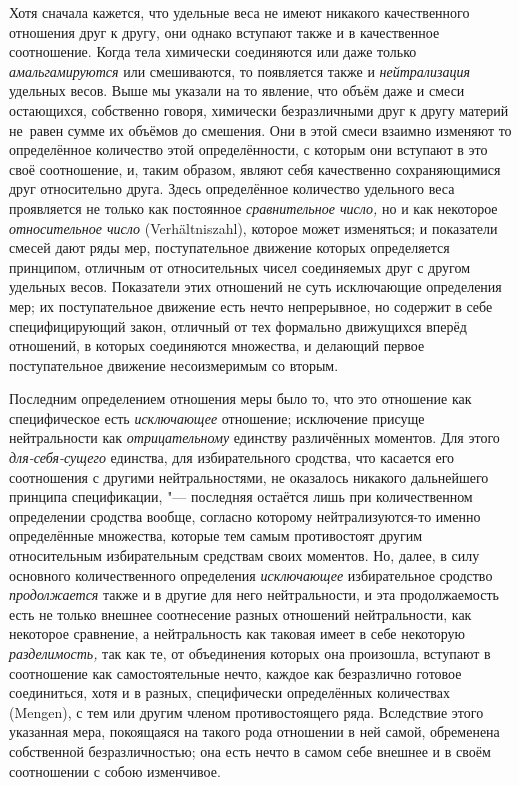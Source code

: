Хотя сначала кажется, что удельные веса не имеют никакого качественного
отношения друг к другу, они однако вступают также и в качественное соотношение.
Когда тела химически соединяются или даже только {\em амальгамируются} или
смешиваются, то появляется также и {\em нейтрализация} удельных весов. Выше
мы указали на то явление, что объём даже и смеси остающихся, собственно говоря,
химически безразличными друг к другу материй не~равен сумме их объёмов до
смешения. Они в этой смеси взаимно изменяют то определённое количество этой
определённости, с которым они вступают в это своё соотношение, и, таким
образом, являют себя качественно сохраняющимися друг относительно друга. Здесь
определённое количество удельного веса проявляется не только как постоянное
{\em сравнительное число,} но и как некоторое {\em относительное число}
(Ver\-hält\-nis\-zahl), которое может изменяться; и показатели смесей дают ряды
мер, поступательное движение которых определяется принципом, отличным от
относительных чисел соединяемых друг с другом удельных весов. Показатели
этих отношений не суть исключающие определения мер; их поступательное движение
есть нечто непрерывное, но содержит в себе специфицирующий закон, отличный от
тех формально движущихся вперёд отношений, в которых соединяются множества, и
делающий первое поступательное движение несоизмеримым со вторым.


Последним определением отношения меры было то, что это отношение как специфическое есть
{\em исключающее} отношение; исключение присуще нейтральности как {\em отрицательному}
единству различённых моментов. Для этого {\em для-себя-сущего} единства, для
избирательного сродства, что касается его соотношения с другими
нейтральностями, не оказалось никакого дальнейшего принципа спецификации, "---
последняя остаётся лишь при количественном определении сродства вообще,
согласно которому нейтрализуются-то именно определённые множества, которые тем
самым противостоят другим относительным избирательным средствам своих моментов.
Но, далее, в силу основного количественного определения {\em исключающее}
избирательное сродство {\em продолжается} также и в другие для него
нейтральности, и эта продолжаемость есть не только внешнее соотнесение разных
отношений нейтральности, как некоторое сравнение, а нейтральность как таковая
имеет в себе некоторую {\em разделимость,} так как те, от объединения которых
она произошла, вступают в соотношение как самостоятельные нечто, каждое как
безразлично готовое соединиться, хотя и в разных, специфически определённых
количествах (Mengen), с тем или другим членом противостоящего ряда. Вследствие этого
указанная мера, покоящаяся на такого рода отношении в ней самой, обременена
собственной безразличностью; она есть нечто в самом себе внешнее и в своём
соотношении с собою изменчивое.

